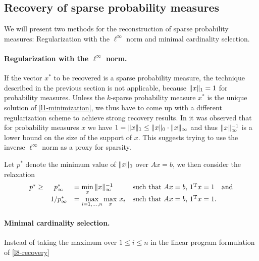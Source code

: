 \documentclass{article} %
\begin{document}
\subsection{Recovery of sparse probability measures}
We will present two methods for the reconstruction of sparse probability measures:  Regularization with the $\ell^\infty$ norm and minimal cardinality selection.
\paragraph{Regularization with the $\ell^\infty$ norm.} If the vector $x^*$ to be recovered is a sparse probability measure, the technique described in the previous section is not applicable, because $\lVert x\rVert_1 = 1$ for probability measures.
Unless the $k$-sparse probability measure $x^*$ is the unique solution of \eqref{l1-minimization}, we thus have to come up with a different regularization scheme to achieve strong recovery results.
In \cite{mert} it was observed that for probability measures $x$ we have $1 = \lVert x\rVert_1 \leq \lVert x\rVert_0\cdot \lVert x\rVert_\infty$ and thus $\lVert x\rVert_{\infty}^{-1}$ is a lower bound on the size of the support of $x$.
This suggests trying to use the inverse $\ell^\infty$ norm as a proxy for sparsity.

Let $p^*$ denote the minimum value of $\lVert x\rVert_0$ over $Ax = b$, we then consider the relaxation
\begin{equation}\label{l8-recovery}
  \begin{array}{rcllllr}
  p^* \geq& p_\infty^* &= \min\limits_x\, \lVert x\rVert_\infty^{-1}&\text{such that $Ax = b$, $1^{\rm T} x = 1$}\quad \text{and}\\[5pt]
  &1/p_\infty^* &= \max\limits_{i=1,\dots,n} \max\limits_{x}\,x_i&\text{such that $Ax = b$, $1^{\rm T} x = 1$.}
  \end{array}
\end{equation}

\paragraph{Minimal cardinality selection.} Instead of taking the maximum over $1\leq i\leq n$ in the linear program formulation of \eqref{l8-recovery}



\end{document}
